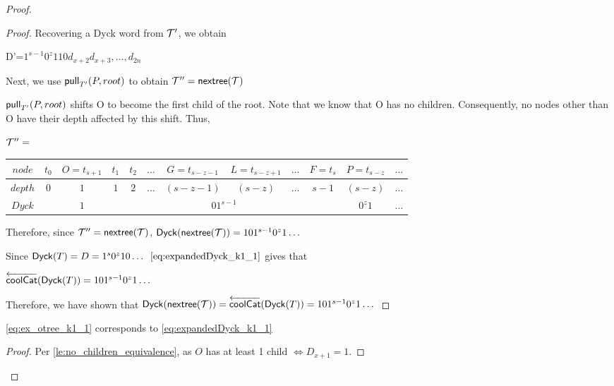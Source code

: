 \begin{proof}
\begin{proof}
    Recovering a Dyck word from $\tree{T}'$, we obtain 

    D'=$1^{s-1}0^z110d_{x+2}d_{x+3},\dots,d_{2n}$


    Next, we use $\poppush[T']{P}{root}$
 to obtain $\tree{T}'' = \nextTree{T}$

    $\poppush[T']{P}{root}$
 shifts O to become the first child of the root. Note that we know that O has no children. Consequently, no nodes other than O have their depth affected by this shift. Thus, 

    \bigskip
    \bigskip


    $\tree{T}''=$
    \begin{center}
	\begin{tabular}{ |c|c|c|c|c|c|c|c|c|c|c|c| } 
	    \hline

	    $node$ & $t_0$ & $O=t_{s+1}$ & $t_1$ & $t_2$ & $\dots$ & $G=t_{s-z-1}$ & $L=t_{s-z+1}$ & $\dots$ & $F=t_s$ & $P=t_{s-z}$ & $\dots$ \\
	    \hline
	    $depth$ & $0$ & $1$ & $1$ & $2$ &$\dots$ & $(s-z-1)$ & $(s-z)$ & $\dots$ & $s-1$ & $(s-z)$   & $\dots$\\
	    \hline
	    $Dyck$ &  & $1$ &  \multicolumn{7}{|c|}{$01^{s-1}$} &  $0^{z}1$   & $\dots$\\
	    \hline
	\end{tabular}
    \end{center}


    \bigskip
    \bigskip




    Therefore, since $\tree{T}''=\nextTree{T}$, $\dyck{\nextTree{T}}=101^{s-1}0^z1\dots$

    Since $\dyck{T}=D=1^s0^{z}10\dots$
    $\ref{eq:expandedDyck_k1_1}$ gives that

    $\coolCat{\dyck{T}}=101^{s-1}0^z1\dots$

    Therefore, we have shown that $\dyck{\nextTree{T}}=\coolCat{\dyck{T}}=101^{s-1}0^z1\dots$

\end{proof}
\begin{lemma}
    \ref{eq:ex_otree_k1_1} corresponds to \ref{eq:expandedDyck_k1_1}
\end{lemma}
\begin{proof}

    Per \ref{le:no_children_equivalence}, as $O$ has at least 1 child $\iff D_{x+1}=1$.


\end{proof}
\end{proof}
